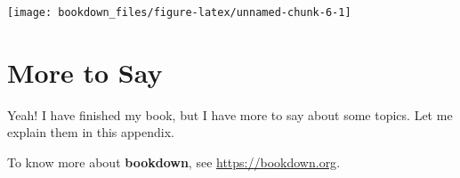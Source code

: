 \documentclass[10pt,a5paper,]{book}
\begin{document}
\texttt{[image: bookdown\_files/figure-latex/unnamed-chunk-6-1]}

\cleardoublepage

\hypertarget{appendix-appendix}{%
\appendix {}}


\hypertarget{more-to-say}{%
\chapter{More to Say}\label{more-to-say}}

Yeah! I have finished my book, but I have more to say about some topics. Let me explain them in this appendix.

To know more about \textbf{bookdown}, see \url{https://bookdown.org}.

\backmatter
\printindex
\end{document}
